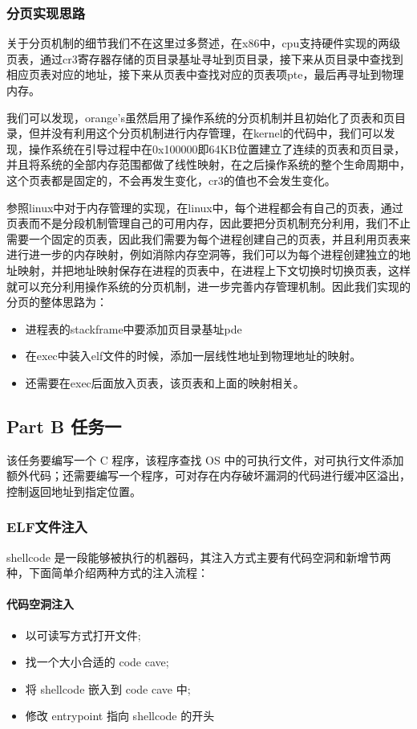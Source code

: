 \documentclass{whureport}
\begin{document}
\subsubsection{分页实现思路}
关于分页机制的细节我们不在这里过多赘述，在x86中，cpu支持硬件实现的两级页表，通过cr3寄存器存储的页目录基址寻址到页目录，接下来从页目录中查找到相应页表对应的地址，接下来从页表中查找对应的页表项pte，最后再寻址到物理内存。

我们可以发现，orange’s虽然启用了操作系统的分页机制并且初始化了页表和页目录，但并没有利用这个分页机制进行内存管理，在kernel的代码中，我们可以发现，操作系统在引导过程中在0x100000即64KB位置建立了连续的页表和页目录，并且将系统的全部内存范围都做了线性映射，在之后操作系统的整个生命周期中，这个页表都是固定的，不会再发生变化，cr3的值也不会发生变化。


参照linux中对于内存管理的实现，在linux中，每个进程都会有自己的页表，通过页表而不是分段机制管理自己的可用内存，因此要把分页机制充分利用，我们不止需要一个固定的页表，因此我们需要为每个进程创建自己的页表，并且利用页表来进行进一步的内存映射，例如消除内存空洞等，我们可以为每个进程创建独立的地址映射，并把地址映射保存在进程的页表中，在进程上下文切换时切换页表，这样就可以充分利用操作系统的分页机制，进一步完善内存管理机制。因此我们实现的分页的整体思路为：

\begin{itemize}
  \item 进程表的stackframe中要添加页目录基址pde
  \item 在exec中装入elf文件的时候，添加一层线性地址到物理地址的映射。
  \item 还需要在exec后面放入页表，该页表和上面的映射相关。
\end{itemize}


\subsection{Part B 任务一}
该任务要编写一个 C 程序，该程序查找 OS 中的可执行文件，对可执行文件添加额外代码；还需要编写一个程序，可对存在内存破坏漏洞的代码进行缓冲区溢出，控制返回地址到指定位置。

\subsubsection{ELF文件注入}


shellcode 是一段能够被执行的机器码，其注入方式主要有代码空洞和新增节两种，下面简单介绍两种方式的注入流程：

\paragraph{代码空洞注入}
\begin{itemize}
  \item 以可读写方式打开文件;
  \item 找一个大小合适的 code cave;
  \item 将 shellcode 嵌入到 code cave 中;
  \item 修改 entrypoint 指向 shellcode 的开头
\end{itemize}
\end{document}
